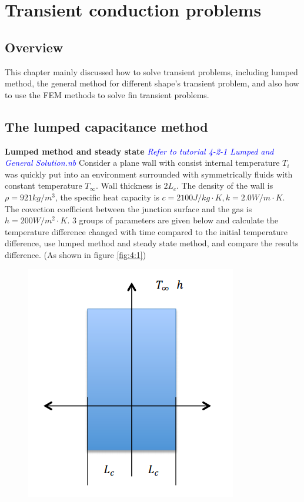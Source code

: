 \chapter{Transient conduction problems}
\section{Overview}
This chapter mainly discussed how to solve transient problems, including lumped method, the general method for different shape’s transient problem, and also how to use the FEM methods to solve fin transient problems.
\section{The lumped capacitance method}

\begin{example}
\textbf{Lumped method and steady state}
\textcolor{blue} {\emph{Refer to tutorial 4-2-1 Lumped and General Solution.nb}}
Consider a plane wall with consist internal temperature $T_i$ was quickly put into an 
environment surrounded with symmetrically fluids with constant temperature $T_\infty$. 
Wall thickness is $2L_c$. The density of the wall is $\rho=921kg/m^3 $,
the specific heat capacity is $c=2100J/kg\cdot K, k=2.0W/m\cdot K$. The covection coefficient between the junction surface and the
gas is $h=200W/m^2\cdot K$. 3 groups of parameters are given below and 
calculate the temperature difference changed with time compared to the initial temperature difference, use lumped method and steady state method, and compare the results difference. (As shown in figure \ref{fig:4:1})
\begin{figure}[H]
  \centering
    \includegraphics[scale=0.6]{figures/ch4/1}

\end{figure}
\end{example}

